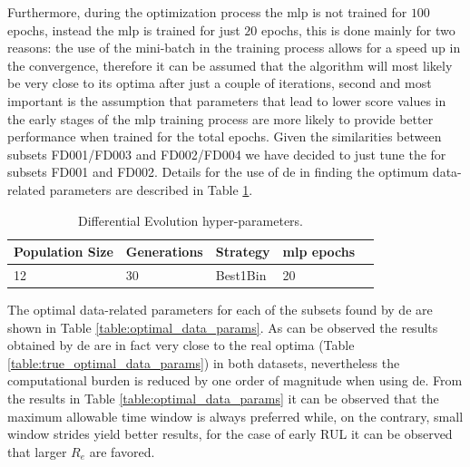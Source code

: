 Furthermore, during the optimization process the \gls{mlp} is not trained for  $100$ epochs, instead the \gls{mlp} is trained for just $20$ epochs, this is done mainly for two reasons: the use of the mini-batch in the training process allows for a speed up in the convergence, therefore it can be assumed that the algorithm will most likely be very close to its optima after just a couple of iterations, second and most important is the assumption that parameters that lead to lower score values in the early stages of the \gls{mlp} training process are more likely to provide better performance when trained for the total epochs. Given the similarities between subsets FD001/FD003 and FD002/FD004 we have decided to just tune the for subsets FD001 and FD002. Details for the use of \gls{de} in finding the optimum data-related parameters are described in Table \ref{table:de_hyperparams}.

\begin{table}[!htb]
\centering
\begin{tabular}{l l l l l}
	\hline
	 Population Size & Generations & Strategy & \gls{mlp} epochs\\
  	\hline
  	12 & 30 & Best1Bin & 20\\
  	\hline
\end{tabular}
\caption{Differential Evolution hyper-parameters.}
\label{table:de_hyperparams}
\end{table}

The optimal data-related parameters for each of the subsets found by \gls{de} are shown in Table \ref{table:optimal_data_params}. As can be observed the results obtained by \gls{de} are in fact very close to the real optima (Table \ref{table:true_optimal_data_params}) in both datasets, nevertheless the computational burden is reduced by one order of magnitude when using \gls{de}. From the results in Table \ref{table:optimal_data_params} it can be observed that the maximum allowable time window is always preferred while, on the contrary, small window strides yield better results, for the case of early RUL it can be observed that larger $R_e$ are favored.

